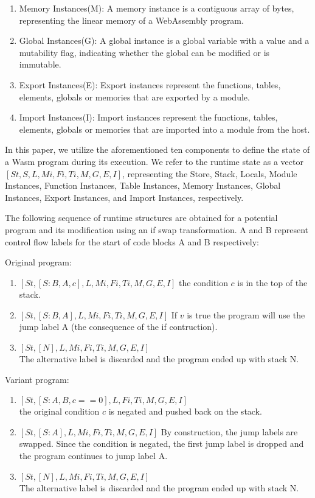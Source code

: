 \begin{enumerate}
    \item  Memory Instances(M): A memory instance is a contiguous array of bytes, representing the linear memory of a WebAssembly program. 

    \item  Global Instances(G): A global instance is a global variable with a value and a mutability flag, indicating whether the global can be modified or is immutable.

    \item Export Instances(E): Export instances represent the functions, tables, elements, globals or memories that are exported by a module. 

    \item Import Instances(I): Import instances represent the functions, tables, elements, globals or memories that are imported into a module from the host. 
\end{enumerate}

In this paper, we utilize the aforementioned ten components to define the state of a Wasm program during its execution. 
We refer to the runtime state as a vector $[St, S, L, Mi, Fi, Ti, M, G, E, I]$, representing the Store, Stack, Locals, Module Instances, Function Instances, Table Instances, Memory Instances, Global Instances, Export Instances, and Import Instances, respectively.


The following sequence of runtime structures are obtained for a potential program and its modification using an if swap transformation. A and B represent control flow labels for the start of code blocks A and B respectively:

Original program:

\begin{enumerate}
    \item $[St, [S: B, A, c], L, Mi, Fi, Ti, M, G, E, I]$ the condition $c$ is in the top of the stack.
    \item $[St, [S: B, A], L, Mi, Fi, Ti, M, G, E, I]$
    If $v$ is true the program will use the jump label A (the consequence of the if contruction).
    \item $[St, [N], L, Mi, Fi, Ti, M, G, E, I]$\\
    The alternative label is discarded and the program ended up with stack N.
\end{enumerate}

Variant program:

\begin{enumerate}
    \item $[St, [S: A, B, c == 0], L, Fi, Ti, M, G, E, I]$\\ the original condition $c$ is negated and pushed back on the stack.
    \item $[St, [S: A], L, Mi, Fi, Ti, M, G, E, I]$
    By construction, the jump labels are swapped. Since the condition is negated, the first jump label is dropped and the program continues to jump label A. 
    \item $[St, [N], L, Mi, Fi, Ti, M, G, E, I]$\\
    The alternative label is discarded and the program ended up with stack N.
\end{enumerate}



